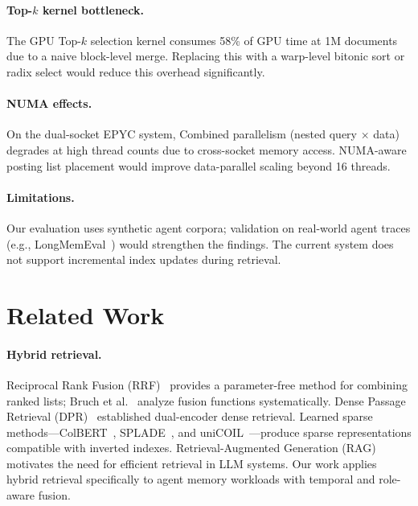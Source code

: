 \documentclass[sigconf,nonacm,anonymous]{acmart}
\begin{document}
\paragraph{Top-$k$ kernel bottleneck.}
The GPU Top-$k$ selection kernel consumes 58\% of GPU time at 1M
documents due to a naive block-level merge.  Replacing this with
a warp-level bitonic sort or radix select would reduce this
overhead significantly.

\paragraph{NUMA effects.}
On the dual-socket EPYC system, Combined parallelism (nested
query $\times$ data) degrades at high thread counts due to
cross-socket memory access.  NUMA-aware posting list placement
would improve data-parallel scaling beyond 16 threads.

\paragraph{Limitations.}
Our evaluation uses synthetic agent corpora; validation on
real-world agent traces (e.g., LongMemEval~\cite{wu2024longmemeval})
would strengthen the findings.  The current system does not support
incremental index updates during retrieval.

\section{Related Work}
\label{sec:related}

\paragraph{Hybrid retrieval.}
Reciprocal Rank Fusion (RRF)~\cite{cormack2009rrf} provides a
parameter-free method for combining ranked lists; Bruch et
al.~\cite{bruch2023fusion} analyze fusion functions systematically.
Dense Passage Retrieval (DPR)~\cite{karpukhin2020dpr} established
dual-encoder dense retrieval.  Learned sparse methods---ColBERT~\cite{khattab2020colbert,santhanam2022colbertv2},
SPLADE~\cite{formal2021splade}, and uniCOIL~\cite{lin2021unicoil}---produce
sparse representations compatible with inverted indexes.
Retrieval-Augmented Generation (RAG)~\cite{lewis2020rag} motivates
the need for efficient retrieval in LLM systems.
Our work applies hybrid retrieval specifically to agent memory
workloads with temporal and role-aware fusion.
\end{document}
